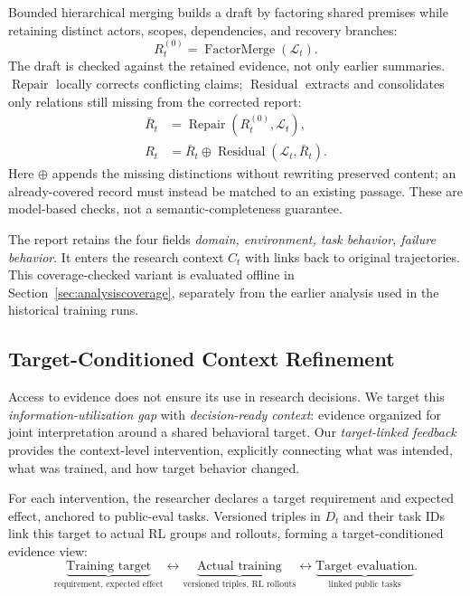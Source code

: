 Bounded hierarchical merging builds a draft by factoring shared premises
while retaining distinct actors, scopes, dependencies, and recovery branches:
\begin{equation}
R_t^{(0)}=\operatorname{FactorMerge}(\mathcal L_t).
\label{eq:factoredmap}
\end{equation}
The draft is checked against the retained evidence, not only earlier
summaries. $\operatorname{Repair}$ locally corrects conflicting claims;
$\operatorname{Residual}$ extracts and consolidates only relations still
missing from the corrected report:
\begin{equation}
\begin{aligned}
\bar R_t &= \operatorname{Repair}(R_t^{(0)},\mathcal L_t),\\
R_t &= \bar R_t \oplus \operatorname{Residual}(\mathcal L_t,\bar R_t).
\end{aligned}
\label{eq:residualmap}
\end{equation}
Here $\oplus$ appends the missing distinctions without rewriting preserved
content; an already-covered record must instead be matched to an existing
passage. These are model-based checks, not a semantic-completeness guarantee.

The report retains the four fields \emph{domain, environment, task behavior,
failure behavior}. It enters the research context $C_t$ with links back to
original trajectories. This coverage-checked variant
is evaluated offline in Section~\ref{sec:analysiscoverage}, separately from
the earlier analysis used in the historical training runs.

\subsection{Target-Conditioned Context Refinement}
\label{sec:planning}

Access to evidence does not ensure its use in research decisions. We target
this \emph{information-utilization gap} with \emph{decision-ready context}:
evidence organized for joint interpretation around a shared behavioral target.
Our \emph{target-linked feedback} provides the context-level intervention,
explicitly connecting what was intended, what was trained, and how target
behavior changed.

For each intervention, the researcher declares a target requirement and
expected effect, anchored to public-eval tasks. Versioned triples in $D_t$
and their task IDs link this target to actual RL groups and rollouts,
forming a target-conditioned evidence view:
\begin{equation}
\underbrace{\text{Training target}}_{\text{requirement, expected effect}}
\longleftrightarrow
\underbrace{\text{Actual training}}_{\text{versioned triples, RL rollouts}}
\longleftrightarrow
\underbrace{\text{Target evaluation}}_{\text{linked public tasks}}.
\label{eq:lineage}
\end{equation}

